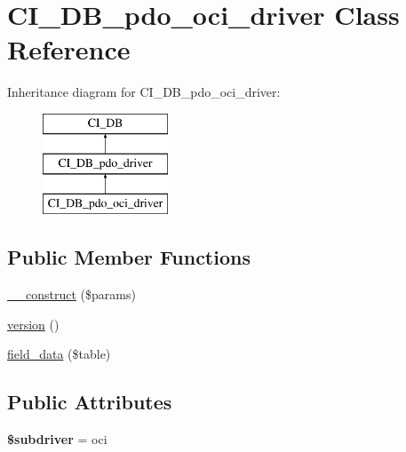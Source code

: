 \hypertarget{class_c_i___d_b__pdo__oci__driver}{}\section{C\+I\+\_\+\+D\+B\+\_\+pdo\+\_\+oci\+\_\+driver Class Reference}
\label{class_c_i___d_b__pdo__oci__driver}
Inheritance diagram for C\+I\+\_\+\+D\+B\+\_\+pdo\+\_\+oci\+\_\+driver\+:\begin{figure}[H]
\begin{center}
\leavevmode
\includegraphics[height=3.000000cm]{class_c_i___d_b__pdo__oci__driver}
\end{center}
\end{figure}
\subsection*{Public Member Functions}
\begin{DoxyCompactItemize}
\item 
\mbox{\hyperlink{class_c_i___d_b__pdo__oci__driver_ac0ed6288a6c9edf3c3671795d8257b55}{\+\_\+\+\_\+construct}} (\$params)
\item 
\mbox{\hyperlink{class_c_i___d_b__pdo__oci__driver_a31488815a38e81451a53c670ebd6679d}{version}} ()
\item 
\mbox{\hyperlink{class_c_i___d_b__pdo__oci__driver_a798288c521e1518fdf7d766b6b31aeff}{field\+\_\+data}} (\$table)
\end{DoxyCompactItemize}
\subsection*{Public Attributes}
\begin{DoxyCompactItemize}
\item 
\mbox{\label{class_c_i___d_b__pdo__oci__driver_ab8014068933831d9bd33b7c3bd1606ed}} 
{\bfseries \$subdriver} = \textquotesingle{}oci\textquotesingle{}
\end{DoxyCompactItemize}
